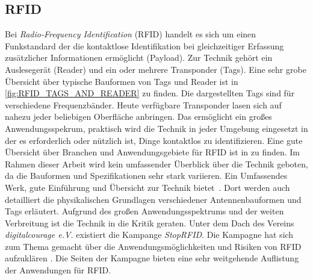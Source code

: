 \subsection{RFID}
%
Bei \textit{Radio-Frequency Identification} (RFID) handelt es sich um einen Funkstandard der die kontaktlose Identifikation bei gleichzeitiger Erfassung zusätzlicher Informationen ermöglicht (Payload). Zur Technik gehört ein Auslesegerät (Reader) und ein oder mehrere Transponder (Tags). Eine sehr grobe Übersicht über typische Bauformen von Tags und Reader ist in \ref{fig:RFID_TAGS_AND_READER} zu finden. Die dargestellten Tags sind für verschiedene Frequenzbänder. Heute verfügbare Transponder lasen sich auf nahezu jeder beliebigen Oberfläche anbringen. Das ermöglicht ein großes Anwendungsspekrum, praktisch wird die Technik in jeder Umgebung eingesetzt in der es erforderlich oder nützlich ist, Dinge kontaktlos zu identifizieren. Eine gute Übersicht über Branchen und Anwendungsgebiete für RFID ist in \cite{RFIDJournal} zu finden. Im Rahmen dieser Arbeit wird kein umfassender Überblick über die Technik geboten, da die Bauformen und Spezifikationen sehr stark variieren. Ein Umfassendes Werk, gute Einführung und Übersicht zur Technik bietet~\cite{finkenzeller2008rfid}. Dort werden auch detailliert die physikalischen Grundlagen verschiedener Antennenbauformen und Tags erläutert. Aufgrund des großen Anwendungsspektrums und der weiten Verbreitung ist die Technik in die Kritik geraten. Unter dem Dach des Vereins \textit{digitalcourage e.V.} existiert die Kampange \textit{StopRFID}. Die Kampagne hat sich zum Thema gemacht über die Anwendungsmöglichkeiten und Risiken von RFID aufzuklären \cite{stoprfid2013}. Die Seiten der Kampagne bieten eine sehr weitgehende Auflistung der Anwendungen für RFID.\\
%
